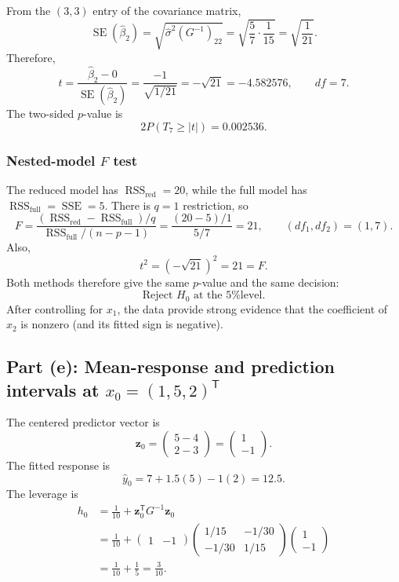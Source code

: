 \documentclass[11pt]{article}
\newcommand{\trans}{\mathsf T}
\newcommand{\RSS}{\operatorname{RSS}}
\newcommand{\SSE}{\operatorname{SSE}}
\newcommand{\SE}{\operatorname{SE}}
\newcommand{\answer}[1]{\boxed{\displaystyle #1}}
\begin{document}
From the \((3,3)\) entry of the covariance matrix,
\[
\SE(\hat\beta_2)
=\sqrt{\hat\sigma^2(G^{-1})_{22}}
=\sqrt{\frac57\cdot\frac1{15}}
=\sqrt{\frac1{21}}.
\]
Therefore,
\[
t=\frac{\hat\beta_2-0}{\SE(\hat\beta_2)}
=\frac{-1}{\sqrt{1/21}}
=-\sqrt{21}
=\answer{-4.582576},
\qquad df=7.
\]
The two-sided \(p\)-value is
\[
 2P(T_7\geq |t|)=\answer{0.002536}.
\]

\subsubsection{Nested-model \(F\) test}

The reduced model has \(\RSS_{\mathrm{red}}=20\), while the full model has
\(\RSS_{\mathrm{full}}=\SSE=5\). There is \(q=1\) restriction, so
\[
F
=\frac{(\RSS_{\mathrm{red}}-\RSS_{\mathrm{full}})/q}
       {\RSS_{\mathrm{full}}/(n-p-1)}
=\frac{(20-5)/1}{5/7}
=\answer{21},
\qquad (df_1,df_2)=(1,7).
\]
Also,
\[
 t^2=(-\sqrt{21})^2=21=F.
\]
Both methods therefore give the same \(p\)-value and the same decision:
\[
\answer{\text{Reject \(H_0\) at the 5\% level.}}
\]
After controlling for \(x_1\), the data provide strong evidence that the
coefficient of \(x_2\) is nonzero (and its fitted sign is negative).

\subsection{Part (e): Mean-response and prediction intervals at \(x_0=(1,5,2)^\trans\)}

The centered predictor vector is
\[
\bm z_0=
\begin{pmatrix}5-4\\2-3\end{pmatrix}
=\begin{pmatrix}1\\-1\end{pmatrix}.
\]
The fitted response is
\[
\hat y_0=7+1.5(5)-1(2)=\answer{12.5}.
\]
The leverage is
\begin{align*}
h_0
&=\frac1{10}+\bm z_0^\trans G^{-1}\bm z_0\\
&=\frac1{10}
+\begin{pmatrix}1&-1\end{pmatrix}
\begin{pmatrix}1/15&-1/30\\-1/30&1/15\end{pmatrix}
\begin{pmatrix}1\\-1\end{pmatrix}\\
&=\frac1{10}+\frac15=\answer{\frac3{10}}.
\end{align*}
\end{document}
